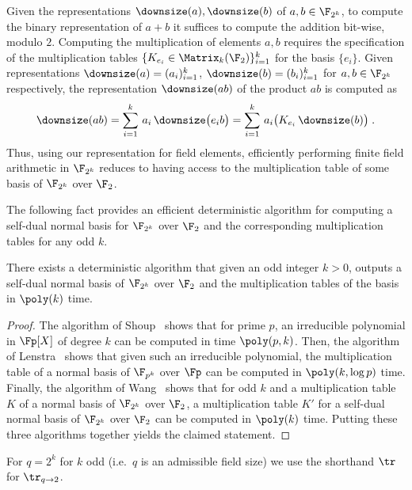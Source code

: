 Given the representations $\downsize(a), \downsize(b)$ of $a, b \in \F_{2^k}$, to
compute the binary representation of $a+b$ it suffices to compute the addition
bit-wise, modulo $2$.
Computing the multiplication of elements $a, b$ requires the specification of
the multiplication tables $\{K_{e_i} \in \Matrix_k (\F_2)\}_{i=1}^k $ for the
basis $\{e_i\}$.
Given representations $\downsize(a) = (a_i)_{i=1}^k$, $\downsize(b) =
(b_i)_{i=1}^k$ for $a, b \in \F_{2^k}$ respectively, the representation
$\downsize(ab)$ of the product $ab$ is computed as
\begin{equation}
  \label{eq:eq-mult}
  \downsize(ab) = \sum_{i=1}^k \, a_i \, \downsize \bigl( e_i b \bigr) =
  \sum_{i=1}^k \, a_i \bigl( K_{e_i}\, \downsize (b) \bigr)\;.
\end{equation}
Thus, using our representation for field elements, efficiently performing finite
field arithmetic in $\F_{2^k}$ reduces to having access to the multiplication
table of some basis of $\F_{2^k}$ over $\F_2$.

The following fact provides an efficient deterministic algorithm for computing a
self-dual normal basis for $\F_{2^k}$ over $\F_2$ and the corresponding
multiplication tables for any odd $k$.

\begin{lemma}
  \label{lem:efficient_basis}
  There exists a deterministic algorithm that given an odd integer $k > 0$,
  outputs a self-dual normal basis of $\F_{2^k}$ over $\F_2$ and the
  multiplication tables of the basis in $\poly(k)$ time.
\end{lemma}

\begin{proof}
	The algorithm of Shoup~\cite[Theorem 3.2]{shoup1990new} shows that for prime
  $p$, an irreducible polynomial in $\Fp[X]$ of degree $k$ can be computed in
  time $\poly(p, k)$.
  Then, the algorithm of Lenstra~\cite[Theorem 1.1]{lenstra1991finding} shows
  that given such an irreducible polynomial, the multiplication table of a
  normal basis of $\F_{p^k}$ over $\Fp$ can be computed in $\poly(k,\log p)$
  time.
  Finally, the algorithm of Wang~\cite{wang1989algorithm} shows that for odd $k$
  and a multiplication table $K$ of a normal basis of $\F_{2^k}$ over $\F_2$, a
  multiplication table $K'$ for a self-dual normal basis of $\F_{2^k}$ over
  $\F_2$ can be computed in $\poly(k)$ time.
  Putting these three algorithms together yields the claimed statement.
\end{proof}

For $q=2^k$ for $k$ odd (i.e.\ $q$ is an admissible field size) we use the shorthand $\tr$ for $\tr_{q\to 2}$.

